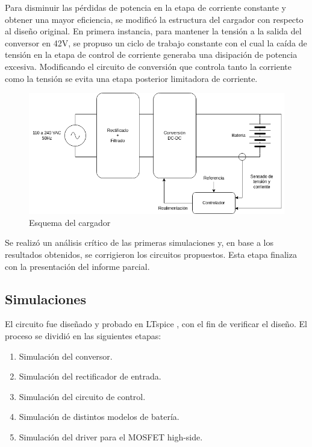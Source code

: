 Para disminuir las pérdidas de potencia en la etapa de corriente constante y obtener una mayor eficiencia, se modificó la estructura del cargador con respecto al diseño original. 
En primera instancia, para mantener la tensión a la salida del conversor en 42V, se propuso un ciclo de trabajo constante 
con el cual la caída de tensión en la etapa de control de corriente generaba una disipación de potencia excesiva.
Modificando el circuito de conversión que controla tanto la corriente como la tensión se evita una etapa posterior limitadora de corriente.

\begin{figure}
    \centering
    \includegraphics[width=\textwidth]{images/esquema_cargador_v2.png}
    \caption{Esquema del cargador}
    \label{fig:esquema_cargador}
\end{figure}

Se realizó un análisis crítico de las primeras simulaciones y, en base a los resultados obtenidos, 
se corrigieron los circuitos propuestos. 
Esta etapa finaliza con la presentación del informe parcial. 

\subsection{Simulaciones}
El circuito fue diseñado y probado en LTspice \cite{ltspice}, con el fin de verificar el diseño.
El proceso se dividió en las siguientes etapas:
\begin{enumerate}
    \item Simulación del conversor.
    \item Simulación del rectificador de entrada.
    \item Simulación del circuito de control.
    \item Simulación de distintos modelos de batería.
    \item Simulación del driver para el MOSFET high-side.
\end{enumerate}

